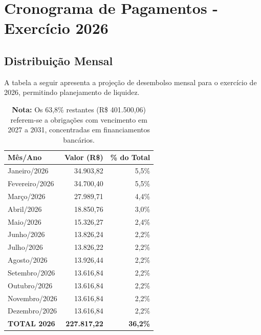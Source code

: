 \documentclass[12pt, a4paper]{article}
\newcommand{\reais}[1]{R\$ #1}
\begin{document}
\newpage

\section{Cronograma de Pagamentos - Exercício 2026}

\subsection{Distribuição Mensal}

A tabela a seguir apresenta a projeção de desembolso mensal para o exercício de 2026, permitindo planejamento de liquidez.

\begin{table}[H]
    \centering
    \renewcommand{\arraystretch}{1.3}
    \begin{tabularx}{0.85\textwidth}{X r r}
        \toprule
        \rowcolor{tableHeader} \textbf{Mês/Ano} & \textbf{Valor (R\$)} & \textbf{\% do Total} \\
        \midrule
        Janeiro/2026 & 34.903,82 & 5,5\% \\
        Fevereiro/2026 & 34.700,40 & 5,5\% \\
        Março/2026 & 27.989,71 & 4,4\% \\
        Abril/2026 & 18.850,76 & 3,0\% \\
        Maio/2026 & 15.326,27 & 2,4\% \\
        Junho/2026 & 13.826,24 & 2,2\% \\
        Julho/2026 & 13.826,22 & 2,2\% \\
        Agosto/2026 & 13.926,44 & 2,2\% \\
        Setembro/2026 & 13.616,84 & 2,2\% \\
        Outubro/2026 & 13.616,84 & 2,2\% \\
        Novembro/2026 & 13.616,84 & 2,2\% \\
        Dezembro/2026 & 13.616,84 & 2,2\% \\
        \midrule
        \rowcolor{lightGray} \textbf{TOTAL 2026} & \textbf{227.817,22} & \textbf{36,2\%} \\
        \bottomrule
    \end{tabularx}
    \caption*{\footnotesize \textbf{Nota:} Os 63,8\% restantes (\reais{401.500,06}) referem-se a obrigações com vencimento em 2027 a 2031, concentradas em financiamentos bancários.}
\end{table}
\end{document}
